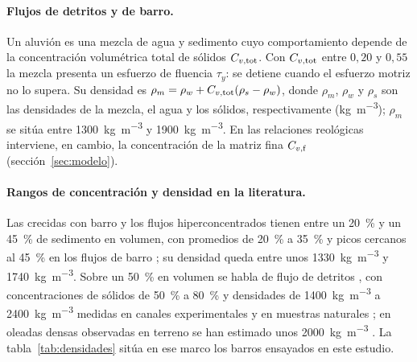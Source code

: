 \paragraph{Flujos de detritos y de barro.} Un aluvión es una mezcla de agua y sedimento cuyo comportamiento depende de la concentración volumétrica total de sólidos $C_{v,\mathrm{tot}}$. Con $C_{v,\mathrm{tot}}$ entre $0{,}20$ y $0{,}55$ la mezcla presenta un esfuerzo de fluencia $\tau_y$: se detiene cuando el esfuerzo motriz no lo supera. Su densidad es $\rho_m=\rho_w+C_{v,\mathrm{tot}}(\rho_s-\rho_w)$, donde $\rho_m$, $\rho_w$ y $\rho_s$ son las densidades de la mezcla, el agua y los sólidos, respectivamente (\si{kg.m^{-3}}); $\rho_m$ se sitúa entre \SI{1300}{kg.m^{-3}} y \SI{1900}{kg.m^{-3}}. En las relaciones reológicas interviene, en cambio, la concentración de la matriz fina $C_{v,\mathrm{f}}$ (sección~\ref{sec:modelo}).

\paragraph{Rangos de concentración y densidad en la literatura.} Las crecidas con barro y los flujos hiperconcentrados tienen entre un \SI{20}{\percent} y un \SI{45}{\percent} de sedimento en volumen, con promedios de \SI{20}{\percent} a \SI{35}{\percent} y picos cercanos al \SI{45}{\percent} en los flujos de barro \citep{obrien1988,flo2d2021}; su densidad queda entre unos \SI{1330}{kg.m^{-3}} y \SI{1740}{kg.m^{-3}}. Sobre un \SI{50}{\percent} en volumen se habla de flujo de detritos \citep{costa1984,zanuttigh2007}, con concentraciones de sólidos de \SI{50}{\percent} a \SI{80}{\percent} y densidades de \SI{1400}{kg.m^{-3}} a \SI{2400}{kg.m^{-3}} medidas en canales experimentales y en muestras naturales \citep{iverson1997}; en oleadas densas observadas en terreno se han estimado unos \SI{2000}{kg.m^{-3}} \citep{zanuttigh2007}. La tabla~\ref{tab:densidades} sitúa en ese marco los barros ensayados en este estudio.

